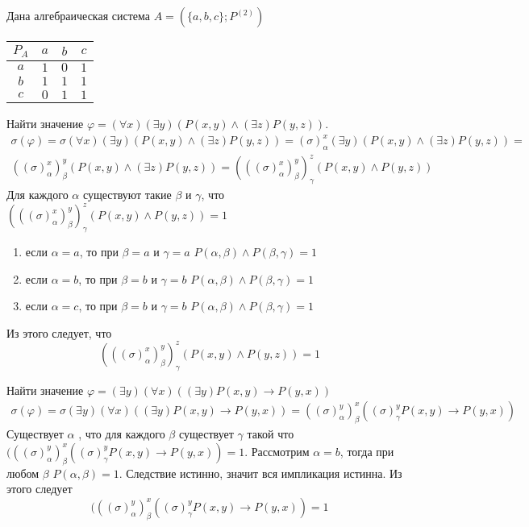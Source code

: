 \documentclass[12pt]{article}
\begin{document}
Дана алгебраическая система $A=(\{a,b,c\};P^{(2)})$
\begin{table}[h]
\begin{tabular}{|c|c|c|c|}
\hline 
$P_A$ & $a$ & $b$ & $c$ \\ 
\hline 
$a$ & $1$ & $0$ & $1$ \\ 
\hline 
$b$ & $1$ & $1$ & $1$ \\ 
\hline 
$c$ & $0$ & $1$ & $1$ \\ 
\hline 
\end{tabular} 
\end{table}

Найти значение $\varphi=(\forall x)(\exists y)(P(x,y)\wedge (\exists z)P(y,z))$.
\begin{multline*}
\sigma(\varphi)=\sigma(\forall x)(\exists y)(P(x,y)\wedge (\exists z)P(y,z))=(\sigma)^x_{\alpha}(\exists y)(P(x,y)\wedge (\exists z)P(y,z))=\\
((\sigma)^x_{\alpha})^y_{\beta}(P(x,y)\wedge (\exists z)P(y,z))=(((\sigma)^x_{\alpha})^y_{\beta})^z_{\gamma}(P(x,y)\wedge P(y,z))
\end{multline*}
Для каждого $\alpha$ существуют такие $\beta$ и $\gamma$, что $(((\sigma)^x_{\alpha})^y_{\beta})^z_{\gamma}(P(x,y)\wedge P(y,z))=1$
\begin{enumerate}
\item если $\alpha = a$, то при $\beta = a$ и $\gamma = a$ $P(\alpha,\beta)\wedge P(\beta,\gamma)=1$
\item если $\alpha = b$, то при $\beta = b$ и $\gamma = b$ $P(\alpha,\beta)\wedge P(\beta,\gamma)=1$
\item если $\alpha = c$, то при $\beta = b$ и $\gamma = b$ $P(\alpha,\beta)\wedge P(\beta,\gamma)=1$
\end{enumerate}
Из этого следует, что 
$$(((\sigma)^x_{\alpha})^y_{\beta})^z_{\gamma}(P(x,y)\wedge P(y,z))=1$$

Найти значение $\varphi = (\exists y)(\forall x)((\exists y)P(x,y)\to P(y,x))$
\begin{multline*}
\sigma(\varphi)=\sigma(\exists y)(\forall x)((\exists y)P(x,y)\to P(y,x))=((\sigma)^y_{\alpha})^x_{\beta}((\sigma)^y_{\gamma}P(x,y)\to P(y,x))
\end{multline*}
Существует $\alpha$ , что для каждого $\beta$ существует $\gamma$ такой что $(((\sigma)^y_{\alpha})^x_{\beta}((\sigma)^y_{\gamma}P(x,y)\to P(y,x))=1$. Рассмотрим $\alpha = b$, тогда при любом $\beta$ $P(\alpha,\beta)=1$. Следствие истинно, значит вся импликация истинна. Из этого следует
$$(((\sigma)^y_{\alpha})^x_{\beta}((\sigma)^y_{\gamma}P(x,y)\to P(y,x))=1$$
\end{document}
